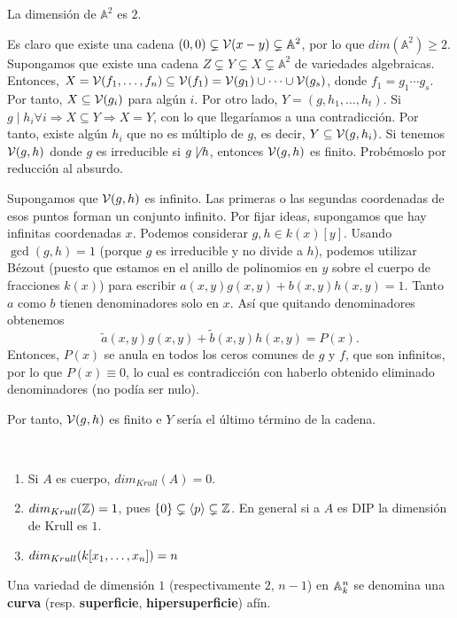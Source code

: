 \documentclass[ACGA.tex]{subfiles}
\begin{document}
\begin{ej}
La dimensión de $\mathbb{A}^2$ es $2$.

Es claro que existe una cadena ${(0,0)}\subsetneq\mathcal{V}(x-y)\subsetneq\mathbb{A}^2$, por lo que $dim(\mathbb{A}^2)\geq 2$. Supongamos que existe una cadena $Z\subsetneq Y\subsetneq X\subsetneq\mathbb{A}^2$ de variedades algebraicas. Entonces, $X=\mathcal{V}(f_1,\dots,f_n)\subseteq\mathcal{V}(f_1)=\mathcal{V}(g_1)\cup\cdots\cup\mathcal{V}(g_s)$, donde $f_1=g_1\cdots g_s$. Por tanto, $X\subseteq\mathcal{V}(g_i)$ para algún $i$. Por otro lado, $Y=(g, h_1,\dots,h_t)$. Si $g\mid h_i\forall i\Rightarrow X\subseteq Y\Rightarrow X=Y$, con lo que llegaríamos a una contradicción. Por tanto, existe algún $h_i$ que no es múltiplo de $g$, es decir, $Y\subseteq\mathcal{V}(g,h_i)$. Si tenemos $\mathcal{V}(g,h)$ donde $g$ es irreducible si $g\not\mid h$, entonces $\mathcal{V}(g,h)$ es finito. Probémoslo por reducción al absurdo.

Supongamos que $\mathcal{V}(g,h)$ es infinito. Las primeras o las segundas coordenadas de esos puntos forman un conjunto infinito. Por fijar ideas, supongamos que hay infinitas coordenadas $x$. Podemos considerar $g,h\in k(x)[y]$. Usando $\gcd(g,h)=1$ (porque $g$ es irreducible y no divide a $h$), podemos utilizar Bézout (puesto que estamos en el anillo de polinomios en $y$ sobre el cuerpo de fracciones $k(x)$) para escribir $a(x,y)g(x,y)+b(x,y)h(x,y)=1$. Tanto $a$ como $b$ tienen denominadores solo en $x$.  Así que quitando denominadores obtenemos 
$$\tilde{a}(x,y)g(x,y)+\tilde{b}(x,y)h(x,y)=P(x).$$
Entonces, $P(x)$ se anula en todos los ceros comunes de $g$ y $f$, que son infinitos, por lo que $P(x)\equiv 0$, lo cual es contradicción con haberlo obtenido eliminado denominadores (no podía ser nulo). 

Por tanto, $\mathcal{V}(g,h)$ es finito e $Y$ sería el último término de la cadena. 

\end{ej}


\begin{ej}\
\begin{enumerate}
\item Si $A$ es cuerpo, $dim_{Krull}(A)=0$.
\item $dim_{Krull}(\mathbb{Z})=1$, pues $\{0\}\subsetneq\langle p\rangle\subsetneq\mathbb{Z}$. En general si a $A$ es DIP la dimensión de Krull es $1$.
\item $dim_{Krull}(k[x_1,\dotsc,x_{n}])=n$
\end{enumerate}
\end{ej}

\begin{defi}
 Una variedad de dimensión $1$ (respectivamente $2$, $n-1$) en $\mathbb{A}^n_k$ se denomina una {\bf curva} (resp. {\bf superficie}, {\bf hipersuperficie}) afín.
\end{defi}
\end{document}
